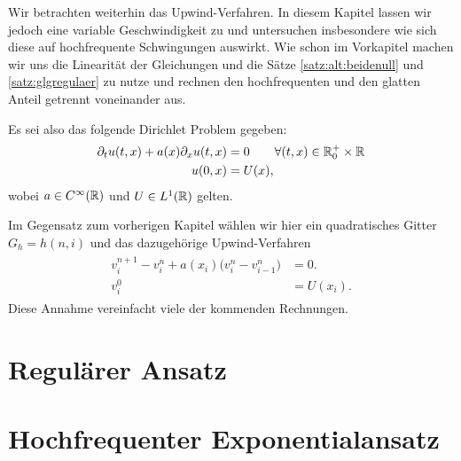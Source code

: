 
Wir betrachten weiterhin das Upwind-Verfahren.
In diesem Kapitel lassen wir jedoch eine variable Geschwindigkeit zu und untersuchen insbesondere wie sich diese auf hochfrequente Schwingungen auswirkt.
Wie schon im Vorkapitel machen wir uns die Linearität der Gleichungen und die Sätze \ref{satz:alt:beidenull} und \ref{satz:glgregulaer} zu nutze und rechnen den hochfrequenten und den glatten Anteil getrennt voneinander aus.

Es sei also das folgende Dirichlet Problem gegeben:
\begin{align}\label{eq:varadv:pde}
\begin{split}
\partial_t u(t, x) + a(x) \partial_x u(t, x) &= 0 \qquad \forall (t, x) \in \mathbb R^+_0 \times \mathbb R\\
u(0, x) &= U(x),
\end{split}
\end{align}
wobei $a \in C^\infty(\mathbb R)$ und $U \in L^1(\mathbb R)$ gelten.

Im Gegensatz zum vorherigen Kapitel wählen wir hier ein quadratisches Gitter $G_h = h (n, i)$ und das dazugehörige Upwind-Verfahren
\begin{align}\label{eq:varadv:verfahren}
\begin{split}
v^{n+1}_i - v^n_i + a(x_i) \bigl( v^n_i - v^n_{i-1} \bigr) &= 0.\\
v^0_i &= U(x_i).
\end{split}
\end{align}
Diese Annahme vereinfacht viele der kommenden Rechnungen.

\section{Regulärer Ansatz}



\section{Hochfrequenter Exponentialansatz}

